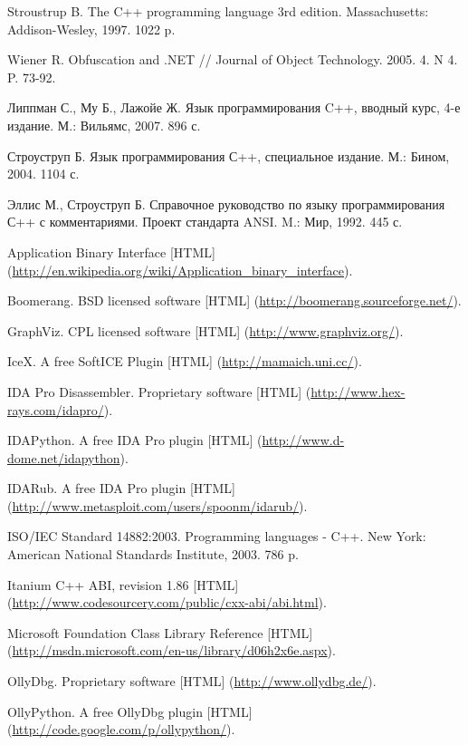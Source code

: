 \begin{thebibliography}{99}
Stroustrup B. The C++ programming language 3rd edition. Massachusetts: Addison-Wesley, 1997. 1022 p.

Wiener R. Obfuscation and .NET // Journal of Object Technology. 2005. 4. N 4. P. 73-92.

Липпман С., Му Б., Лажойе Ж. Язык программирования C++, вводный курс, 4-е издание. М.: Вильямс, 2007. 896 с.

Строуструп Б. Язык программирования С++, специальное издание. М.: Бином, 2004. 1104 с.

Эллис М., Строуструп Б. Справочное руководство по языку программирования С++ с комментариями. Проект стандарта ANSI. M.: Мир, 1992. 445 с.

Application Binary Interface [HTML] (\url{http://en.wikipedia.org/wiki/Application_binary_interface}).

Boomerang. BSD licensed software [HTML] (\url{http://boomerang.sourceforge.net/}).

GraphViz. CPL licensed software [HTML] (\url{http://www.graphviz.org/}).

IceX. A free SoftICE Plugin [HTML] (\url{http://mamaich.uni.cc/}).

IDA Pro Disassembler. Proprietary software [HTML] (\url{http://www.hex-rays.com/idapro/}).

IDAPython. A free IDA Pro plugin [HTML] (\url{http://www.d-dome.net/idapython}).

IDARub. A free IDA Pro plugin [HTML] (\url{http://www.metasploit.com/users/spoonm/idarub/}).

ISO/IEC Standard 14882:2003. Programming languages - C++. New York: American National Standards Institute, 2003. 786 p.

Itanium C++ ABI, revision 1.86 [HTML] (\url{http://www.codesourcery.com/public/cxx-abi/abi.html}).

Microsoft Foundation Class Library Reference [HTML] (\url{http://msdn.microsoft.com/en-us/library/d06h2x6e.aspx}).

OllyDbg. Proprietary software [HTML] (\url{http://www.ollydbg.de/}).

OllyPython. A free OllyDbg plugin [HTML] (\url{http://code.google.com/p/ollypython/}).


\end{thebibliography}

